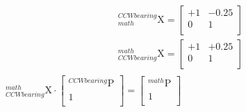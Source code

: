 \documentclass[12pt,fleqn]{standalone}
\begin{document}
\begin{preview}
\Large
\[
\begin{aligned}
{\displaystyle _{math}^{CCW bearing}\textrm{X}=
\begin{bmatrix}
+1 & -0.25 \\
0 & 1 \\
\end{bmatrix}}\\
{\displaystyle _{CCW bearing}^{math}\textrm{X}=
\begin{bmatrix}
+1 & +0.25 \\
0 & 1 \\
\end{bmatrix}}\\
\end{aligned}
\]
${\displaystyle _{CCWbearing}^{math}\textrm{X} \cdot \begin{bmatrix}
		_{}^{CCWbearing}\textrm{P} \\
		1 \\
	\end{bmatrix}=\begin{bmatrix}
		_{}^{math}\textrm{P} \\
		1 \\
\end{bmatrix}}$
\end{preview}
\end{document}
